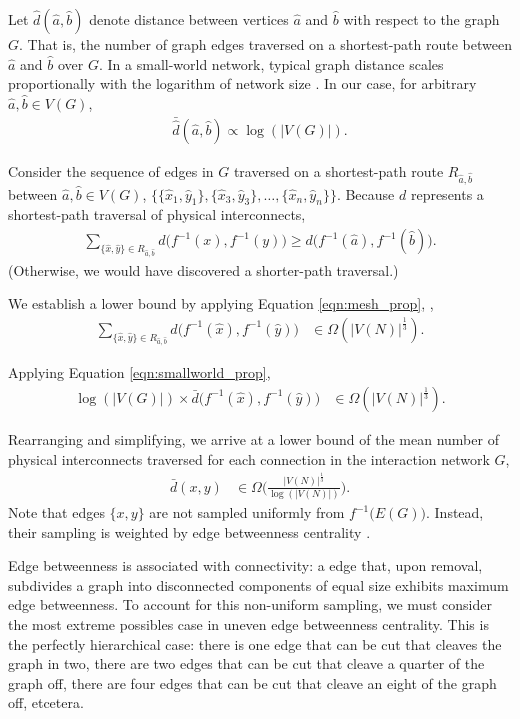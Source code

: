Let $\hat{d}(\hat{a},\hat{b})$ denote distance between vertices $\hat{a}$ and $\hat{b}$ with respect to the graph $G$.
That is, the number of graph edges traversed on a shortest-path route between $\hat{a}$ and $\hat{b}$ over $G$.
In a small-world network, typical graph distance scales proportionally with the logarithm of network size \citep{watts1998collective}.
In our case, for arbitrary $\hat{a},\hat{b} \in V(G)$,
\begin{align} \label{eqn:smallworld_prop}
\bar{\hat{d}}(\hat{a},\hat{b}) \propto \log(|V(G)|).
\end{align}

Consider the sequence of edges in $G$ traversed on a shortest-path route $R_{\hat{a},\hat{b}}$ between $\hat{a}, \hat{b} \in V(G)$, $\{\{\hat{x}_1, \hat{y}_1\}, \{\hat{x}_3, \hat{y}_3\}, \ldots, \{\hat{x}_n, \hat{y}_n\} \}$.
Because $d$ represents a shortest-path traversal of physical interconnects,
\begin{align*}
\sum_{\{\hat{x}, \hat{y}\} \in  R_{\hat{a},\hat{b}}} d\Big(f^{-1}(x), f^{-1}(y)\Big)
\geq d\Big(f^{-1}(\hat{a}), f^{-1}(\hat{b})\Big).
\end{align*}
(Otherwise, we would have discovered a shorter-path traversal.)

We establish a lower bound by applying Equation \ref{eqn:mesh_prop}, ,
\begin{align*}
\sum_{\{\hat{x}, \hat{y}\} \in  R_{\hat{a},\hat{b}}} d\Big(f^{-1}(\hat{x}), f^{-1}(\hat{y})\Big)
&\in
\Omega(
  |V(N)|^{\frac{1}{3}}
).
\end{align*}


Applying Equation \ref{eqn:smallworld_prop},
\begin{align*}
\log(|V(G)|) \times \bar{d}\Big(f^{-1}(\hat{x}), f^{-1}(\hat{y})\Big)
&\in
\Omega(
  |V(N)|^{\frac{1}{3}}
).
\end{align*}

Rearranging and simplifying, we arrive at a lower bound of the mean number of physical interconnects traversed for each connection in the interaction network $G$,
\begin{align*}
\bar{d}(x, y)
&\in
\Omega \Big(
  \frac{|V(N)|^{\frac{1}{3}}}{\log(|V(N)|)}
\Big).
\end{align*}
Note that edges $\{x,y\}$ are not sampled uniformly from $f^{-1}\Big(E(G)\Big)$.
Instead, their sampling is weighted by edge betweenness centrality \citep{Lu2013}.

Edge betweenness is associated with connectivity: a edge that, upon removal, subdivides a graph into disconnected components of equal size exhibits maximum edge betweenness.
To account for this non-uniform sampling, we must consider the most extreme possibles case in uneven edge betweenness centrality.
This is the perfectly hierarchical case: there is one edge that can be cut that cleaves the graph in two, there are two edges that can be cut that cleave a quarter of the graph off, there are four edges that can be cut that cleave an eight of the graph off, etcetera.

